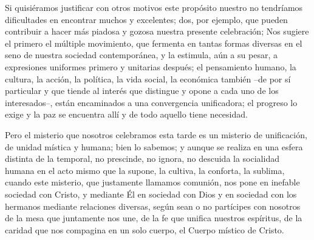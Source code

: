 			\begin{body}Si quisiéramos justificar con otros motivos este propósito nuestro no tendríamos dificultades en encontrar muchos y excelentes; dos, por ejemplo, que pueden contribuir a hacer más piadosa y gozosa nuestra presente celebración; Nos sugiere el primero el múltiple movimiento, que fermenta en tantas formas diversas en el seno de nuestra sociedad contemporánea, y la estimula, aún a su pesar, a expresiones uniformes primero y unitarias después; el pensamiento humano, la cultura, la acción, la política, la vida social, la económica también –de por sí particular y que tiende al interés que distingue y opone a cada uno de los interesados–, están encaminados a una convergencia unificadora; el progreso lo exige y la paz se encuentra allí y de todo aquello tiene necesidad.\end{body}
			
			\begin{body}Pero el misterio que nosotros celebramos esta tarde es un misterio de unificación, de unidad mística y humana; bien lo sabemos; y aunque se realiza en una esfera distinta de la temporal, no prescinde, no ignora, no descuida la socialidad humana en el acto mismo que la supone, la cultiva, la conforta, la sublima, cuando este misterio, que justamente llamamos comunión, nos pone en inefable sociedad con Cristo, y mediante Él en sociedad con Dios y en sociedad con los hermanos mediante relaciones diversas, según sean o no partícipes con nosotros de la mesa que juntamente nos une, de la fe que unifica nuestros espíritus, de la caridad que nos compagina en un solo cuerpo, el Cuerpo místico de Cristo.\end{body}
			
